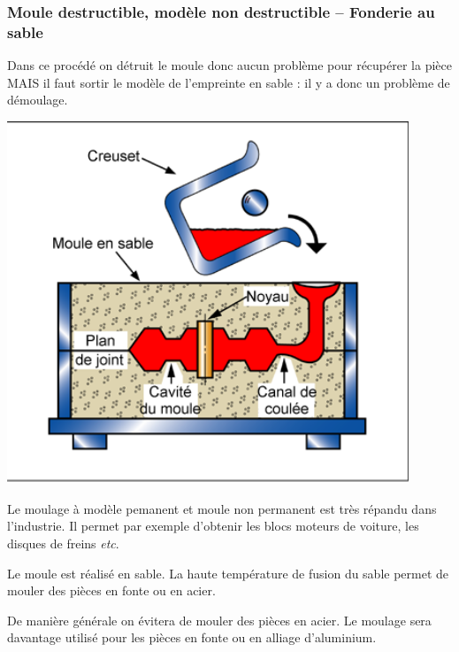 \documentclass[11pt,oneside]{article}
\begin{document}
\subsubsection{Moule destructible, modèle non destructible -- Fonderie au sable}
\begin{rem}
Dans ce procédé on détruit le moule donc aucun problème pour récupérer la pièce MAIS il faut sortir le modèle de l'empreinte en sable : il y a donc un problème de démoulage.
\end{rem}


\begin{minipage}[c]{.3\linewidth}
\begin{center}
\includegraphics[width=0.9\textwidth]{png/moulage}
\end{center}
\end{minipage}\hfill
\begin{minipage}[c]{.65\linewidth}

Le moulage à modèle pemanent et moule non permanent est très répandu dans l'industrie. Il permet par exemple d'obtenir les blocs moteurs de voiture, les disques de freins \textit{etc}.

Le moule est réalisé en sable. La haute température de fusion du sable permet de mouler des pièces en fonte ou en acier. 
\begin{rem}
De manière générale on évitera de mouler des pièces en acier. Le moulage sera davantage utilisé pour les pièces en fonte ou en alliage d'aluminium.
\end{rem}

\end{minipage}
\end{document}
